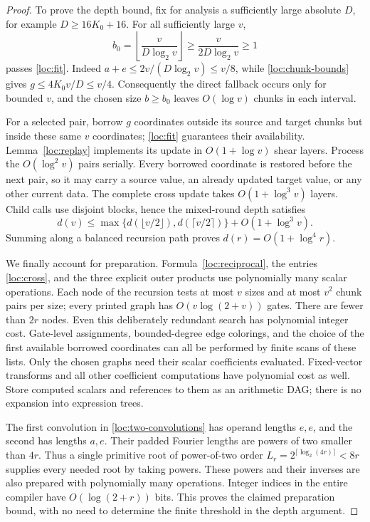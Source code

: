 \begin{proof}
To prove the depth bound, fix for analysis a sufficiently large
absolute $D$, for example $D\ge16K_0+16$.  For all sufficiently large
$v$,
\[
 b_0=\left\lfloor\frac{v}{D\log_2v}\right\rfloor
 \ge\frac{v}{2D\log_2v}\ge1
\]
passes \eqref{loc:fit}.  Indeed $a+e\le2v/(D\log_2v)\le v/8$, while
\eqref{loc:chunk-bounds} gives $g\le4K_0v/D\le v/4$.
Consequently the direct fallback occurs only for bounded $v$, and the
chosen size $b\ge b_0$ leaves $O(\log v)$ chunks in each interval.

For a selected pair, borrow $g$ coordinates outside its source and
target chunks but inside these same $v$ coordinates; \eqref{loc:fit}
guarantees their availability.  Lemma~\ref{loc:replay} implements its
update in $O(1+\log v)$ shear layers.  Process the $O(\log^2v)$ pairs
serially.  Every borrowed coordinate is restored before the next pair,
so it may carry a source value, an already updated target value, or any
other current data.  The complete cross update takes
$O(1+\log^3v)$ layers.  Child calls use disjoint blocks, hence the
mixed-round depth satisfies
\[
 d(v)\le\max\{d(\lfloor v/2\rfloor),d(\lceil v/2\rceil)\}
          +O(1+\log^3v).
\]
Summing along a balanced recursion path proves
$d(r)=O(1+\log^4r)$.

We finally account for preparation.  Formula~\eqref{loc:reciprocal},
the entries \eqref{loc:cross}, and the three explicit outer products
use polynomially many scalar operations.  Each node of the recursion
tests at most $v$ sizes and at most $v^2$ chunk pairs per size; every
printed graph has $O(v\log(2+v))$ gates.  There are fewer than $2r$
nodes.  Even this deliberately redundant search has polynomial
integer cost.  Gate-level assignments, bounded-degree edge colorings,
and the choice of the first available borrowed coordinates can all be
performed by finite scans of these lists.  Only the chosen graphs
need their scalar coefficients evaluated.  Fixed-vector transforms
and all other coefficient computations have polynomial cost as well.
Store computed scalars and references to them as an arithmetic DAG;
there is no expansion into expression trees.

The first convolution in \eqref{loc:two-convolutions} has operand
lengths $e,e$, and the second has lengths $a,e$.  Their padded Fourier
lengths are powers of two smaller than $4r$.  Thus a single primitive
root of power-of-two order $L_r=2^{\lceil\log_2(4r)\rceil}<8r$
supplies every needed root by taking powers.  These powers and their
inverses are also prepared with polynomially many operations.  Integer
indices in the entire compiler have $O(\log(2+r))$ bits.  This proves
the claimed preparation bound, with no need to determine the finite
threshold in the depth argument.
\end{proof}


